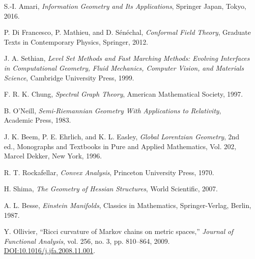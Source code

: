 \documentclass[twoside,twocolumn]{article}
\numberwithin{equation}{section} %
\begin{document}
\begin{thebibliography}{99}


S.-I. Amari,
\textit{Information Geometry and Its Applications},
Springer Japan, Tokyo, 2016.

P. Di Francesco, P. Mathieu, and D. S\'en\'echal, %
\textit{Conformal Field Theory},
Graduate Texts in Contemporary Physics, Springer, 2012.

J. A. Sethian,
\textit{Level Set Methods and Fast Marching Methods: Evolving Interfaces in Computational Geometry, Fluid Mechanics, Computer Vision, and Materials Science},
Cambridge University Press, 1999.

F. R. K. Chung,
\textit{Spectral Graph Theory},
American Mathematical Society, 1997.


B. O'Neill,
\textit{Semi-Riemannian Geometry With Applications to Relativity},
Academic Press, 1983.

J. K. Beem, P. E. Ehrlich, and K. L. Easley,
\textit{Global Lorentzian Geometry},
2nd ed., Monographs and Textbooks in Pure and Applied Mathematics, Vol. 202, Marcel Dekker, New York, 1996.

R. T. Rockafellar,
\textit{Convex Analysis},
Princeton University Press, 1970.

H. Shima,
\textit{The Geometry of Hessian Structures},
World Scientific, 2007.

A. L. Besse,
\textit{Einstein Manifolds},
Classics in Mathematics, Springer-Verlag, Berlin, 1987. %

Y. Ollivier,
``Ricci curvature of Markov chains on metric spaces,''
\textit{Journal of Functional Analysis}, vol. 256, no. 3, pp. 810--864, 2009.
\href{https://doi.org/10.1016/j.jfa.2008.11.001}{DOI:10.1016/j.jfa.2008.11.001}.


\end{thebibliography}
\end{document}
